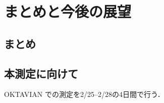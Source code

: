 \documentclass[../master]{subfiles}
\begin{document}
\chapter{まとめと今後の展望}
\section{まとめ}

\section{本測定に向けて}
OKTAVIAN での測定を2/25--2/28の4日間で行う．
\end{document}
